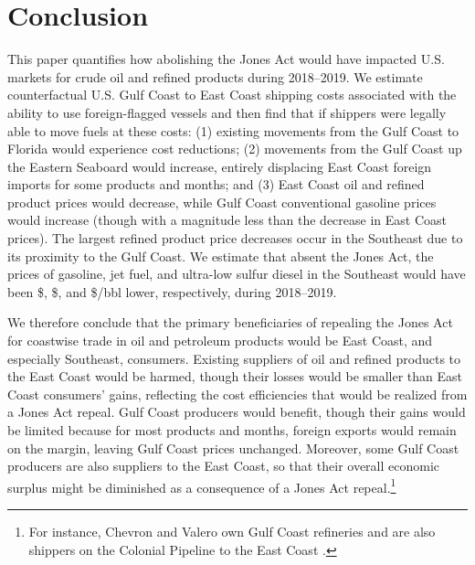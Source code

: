\documentclass[12pt]{article}
\begin{document}
\section{Conclusion \label{sec:Conclusion}}

This paper quantifies how abolishing the Jones Act would have impacted U.S. markets for crude oil and refined products during 2018--2019. We estimate counterfactual U.S. Gulf Coast to East Coast shipping costs associated with the ability to use foreign-flagged vessels and then find that if shippers were legally able to move fuels at these costs: (1) existing movements from the Gulf Coast to Florida would experience cost reductions; (2) movements from the Gulf Coast up the Eastern Seaboard would increase, entirely displacing East Coast foreign imports for some products and months; and (3) East Coast oil and refined product prices would decrease, while Gulf Coast conventional gasoline prices would increase (though with a magnitude less than the decrease in East Coast prices). The largest refined product price decreases occur in the Southeast due to its proximity to the Gulf Coast. We estimate that absent the Jones Act, the prices of gasoline, jet fuel, and ultra-low sulfur diesel in the Southeast would have been \$\unskip, \$\unskip, and \$\unskip/bbl lower, respectively, during 2018--2019.

We therefore conclude that the primary beneficiaries of repealing the Jones Act for coastwise trade in oil and petroleum products would be East Coast, and especially Southeast, consumers. Existing suppliers of oil and refined products to the East Coast would be harmed, though their losses would be smaller than East Coast consumers' gains, reflecting the cost efficiencies that would be realized from a Jones Act repeal. Gulf Coast producers would benefit, though their gains would be limited because for most products and months, foreign exports would remain on the margin, leaving Gulf Coast prices unchanged. Moreover, some Gulf Coast producers are also suppliers to the East Coast, so that their overall economic surplus might be diminished as a consequence of a Jones Act repeal.\footnote{For instance, Chevron and Valero own Gulf Coast refineries and are also shippers on the Colonial Pipeline to the East Coast \citep{Reuters_Colonial}.}
\end{document}
